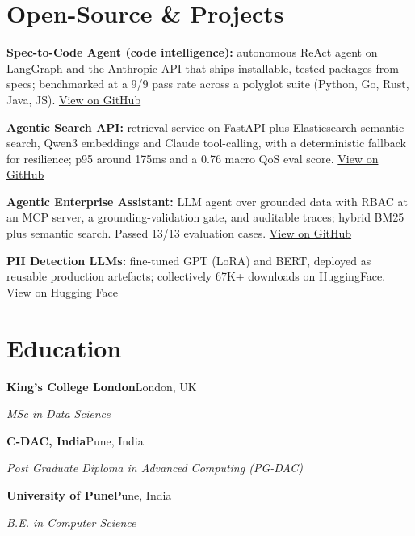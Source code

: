 \documentclass[10pt,a4paper]{article}
\begin{document}
\section{Open-Source \& Projects}
\begin{tight}
  \item \textbf{Spec-to-Code Agent (code intelligence):} autonomous ReAct agent on LangGraph and the Anthropic API that ships installable, tested packages from specs; benchmarked at a 9/9 pass rate across a polyglot suite (Python, Go, Rust, Java, JS). \href{https://github.com/abhijeetscode/Spec-to-Code-Agent}{View on GitHub}
  \item \textbf{Agentic Search API:} retrieval service on FastAPI plus Elasticsearch semantic search, Qwen3 embeddings and Claude tool-calling, with a deterministic fallback for resilience; p95 around 175ms and a 0.76 macro QoS eval score. \href{https://github.com/abhijeetscode/search-agent}{View on GitHub}
  \item \textbf{Agentic Enterprise Assistant:} LLM agent over grounded data with RBAC at an MCP server, a grounding-validation gate, and auditable traces; hybrid BM25 plus semantic search. Passed 13/13 evaluation cases. \href{https://github.com/abhijeetscode/Agentic-Enterprise-Assistant}{View on GitHub}
  \item \textbf{PII Detection LLMs:} fine-tuned GPT (LoRA) and BERT, deployed as reusable production artefacts; collectively 67K+ downloads on HuggingFace. \href{https://huggingface.co/ab-ai/pii_model}{View on Hugging Face}
\end{tight}

\section{Education}
{\color{company}\bfseries King's College London}\hfill {\color{muted}London, UK}\par
{\itshape MSc in Data Science}\par\vspace{2pt}
{\color{company}\bfseries C-DAC, India}\hfill {\color{muted}Pune, India}\par
{\itshape Post Graduate Diploma in Advanced Computing (PG-DAC)}\par\vspace{2pt}
{\color{company}\bfseries University of Pune}\hfill {\color{muted}Pune, India}\par
{\itshape B.E. in Computer Science}\par
\end{document}
